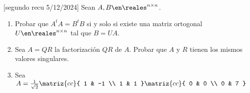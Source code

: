 \begin{enunciado}{\ejExtra}
  {\tiny[segundo recu 5/12/2024]} Sean $A, B \en \reales^{n \times n}$.
  \begin{enumerate}[label=(\alph*)]
    \item
          Probar que $A^t A = B^t B$ si y solo si existe una matriz ortogonal $U \en \reales^{n \times n}$ tal que
          $B = UA$.

    \item
          Sea $A = QR$ la factorización $QR$ de $A$. Probar que $A$ y $R$ tienen los mismos valores singulares.

    \item
          Sea $
            A = \frac{1}{\sqrt{2}}
            \matriz{cc}{
              1 & -1 \\
              1 & 1
            }
            \matriz{cc}{
              0 & 0 \\
              0 & 7
            }
          $
  \end{enumerate}
\end{enunciado}

